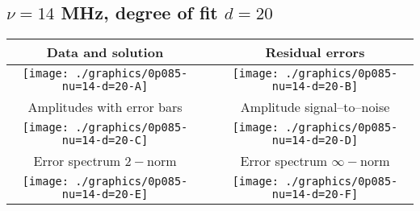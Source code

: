 

% 

\clearpage{}
\break{}

\subsection{$\nu = 14$ MHz, degree of fit $d = 20$}

\begin{table}[h]
    \begin{center}
        \begin{tabular}{ccc}
            Data and solution & \quad & Residual errors \\\hline
            \texttt{[image: ./graphics/0p085-nu=14-d=20-A]} &&
            \texttt{[image: ./graphics/0p085-nu=14-d=20-B]} \\[15pt]
            Amplitudes with error bars && Amplitude signal--to--noise \\\hline
            \texttt{[image: ./graphics/0p085-nu=14-d=20-C]} &&
            \texttt{[image: ./graphics/0p085-nu=14-d=20-D]} \\[15pt]
            Error spectrum $2-$norm && Error spectrum $\infty-$norm \\\hline
            \texttt{[image: ./graphics/0p085-nu=14-d=20-E]} &&
            \texttt{[image: ./graphics/0p085-nu=14-d=20-F]} \\[15pt]
        \end{tabular}
    \end{center}
\label{fig:elev=85, nu=14}
\end{table}



\endinput

